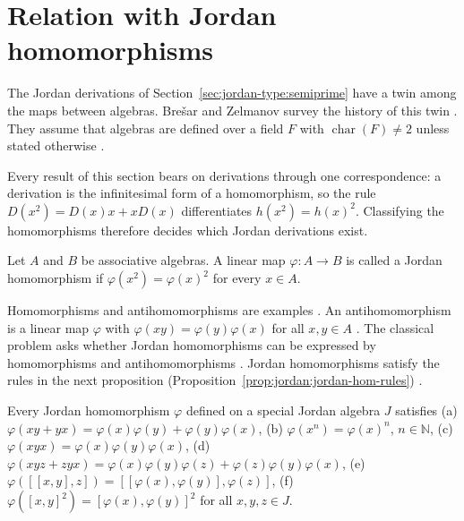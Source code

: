 \section{Relation with Jordan homomorphisms}\label{sec:jordan-type:jordan-homomorphisms}

The Jordan derivations of Section~\ref{sec:jordan-type:semiprime} have a twin among the maps
between algebras. Brešar and Zelmanov survey the history of this twin
\cite[Abstract, p.~203]{BresarZelmanov2025}. They assume that algebras are defined over a field $F$
with $\operatorname{char}(F)\neq2$ unless stated otherwise \cite[Section~1, p.~203]{BresarZelmanov2025}.

Every result of this section bears on derivations through one correspondence: a derivation is the infinitesimal form of a homomorphism, so the rule $D(x^2)=D(x)x+xD(x)$ differentiates $h(x^2)=h(x)^2$. Classifying the homomorphisms therefore decides which Jordan derivations exist.

\begin{definition}\label{def:jordan:jordan-hom}
Let $A$ and $B$ be associative algebras. A linear map $\varphi\colon A\to B$ is called a Jordan
homomorphism if $\varphi(x^{2})=\varphi(x)^{2}$ for every $x\in A$.
\end{definition}

Homomorphisms and antihomomorphisms are examples \cite[p.~204]{BresarZelmanov2025}. An
antihomomorphism is a linear map $\varphi$ with $\varphi(xy)=\varphi(y)\varphi(x)$ for all
$x,y\in A$ \cite[p.~204]{BresarZelmanov2025}. The classical problem asks whether Jordan
homomorphisms can be expressed by homomorphisms and antihomomorphisms
\cite[p.~204]{BresarZelmanov2025}. Jordan homomorphisms satisfy the rules in the next
proposition (Proposition~\ref{prop:jordan:jordan-hom-rules}) \cite[p.~209]{BresarZelmanov2025}.

\begin{proposition}\label{prop:jordan:jordan-hom-rules}
Every Jordan homomorphism $\varphi$ defined on a special Jordan algebra $J$ satisfies
(a) $\varphi(xy+yx)=\varphi(x)\varphi(y)+\varphi(y)\varphi(x)$,
(b) $\varphi(x^{n})=\varphi(x)^{n}$, $n\in\mathbb{N}$,
(c) $\varphi(xyx)=\varphi(x)\varphi(y)\varphi(x)$,
(d) $\varphi(xyz+zyx)=\varphi(x)\varphi(y)\varphi(z)+\varphi(z)\varphi(y)\varphi(x)$,
(e) $\varphi([[x,y],z])=[[\varphi(x),\varphi(y)],\varphi(z)]$,
(f) $\varphi([x,y]^{2})=[\varphi(x),\varphi(y)]^{2}$
for all $x,y,z\in J$.
\end{proposition}

